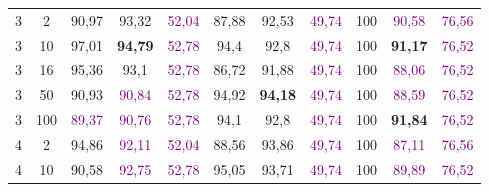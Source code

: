 \begin{table}[ht]
\begin{tabular}{cc|ccc|ccc|ccc}
        {3}                           & {2}     & {90,97}                             & {93,32}                             & \textcolor{purple}{52,04}                & {87,88}                         & {92,53}                         & \textcolor{purple}{49,74}      & {100}                           & \textcolor{purple}{90,58}       & \textcolor{purple}{76,56}      \\
        {3}                           & {10}    & {97,01}                             & \textbf{{94,79}}                    & \textcolor{purple}{52,78}                & {94,4}                          & {92,8}                          & \textcolor{purple}{49,74}      & {100}                           & \textbf{91,17}                  & \textcolor{purple}{76,52}      \\
        {3}                           & {16}    & {95,36}                             & {93,1}                              & \textcolor{purple}{52,78}                & {86,72}                         & {91,88}                         & \textcolor{purple}{49,74}      & {100}                           & \textcolor{purple}{88,06}       & \textcolor{purple}{76,52}      \\
        {3}                           & {50}    & {90,93}                             & \textcolor{purple}{90,84}           & \textcolor{purple}{52,78}                & {94,92}                         & \textbf{94,18}                  & \textcolor{purple}{49,74}      & {100}                           & \textcolor{purple}{88,59}       & \textcolor{purple}{76,52}      \\
        {3}                           & {100}   & \textcolor{purple}{89,37}           & \textcolor{purple}{90,76}           & \textcolor{purple}{52,78}                & {94,1}                          & {92,8}                          & \textcolor{purple}{49,74}      & {100}                           & \textbf{91,84}                  & \textcolor{purple}{76,52}      \\
        {4}                           & {2}     & {94,86}                             & \textcolor{purple}{92,11}           & \textcolor{purple}{52,04}                & {88,56}                         & {93,86}                         & \textcolor{purple}{49,74}      & {100}                           & \textcolor{purple}{87,11}       & \textcolor{purple}{76,56}      \\
        {4}                           & {10}    & {90,58}                             & \textcolor{purple}{92,75}           & \textcolor{purple}{52,78}                & {95,05}                         & {93,71}                         & \textcolor{purple}{49,74}      & {100}                           & \textcolor{purple}{89,89}       & \textcolor{purple}{76,52}      \\

\end{tabular}
\end{table}
